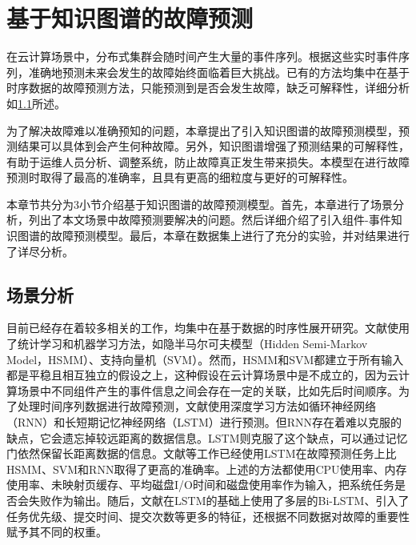 \chapter{基于知识图谱的故障预测}\label{chapter-predict-failure}
在云计算场景中，分布式集群会随时间产生大量的事件序列。根据这些实时事件序列，准确地预测未来会发生的故障始终面临着巨大挑战。已有的方法\cite{pitakrat2018hora,zhang2018prefix,baldoni2015line,xu2016health,cheng2018machine,du2017deeplog,das2018desh,islam2017predicting,cheng2018machine,du2017deeplog,das2018desh,gao2020task}均集中在基于时序数据的故障预测方法，只能预测到是否会发生故障，缺乏可解释性，详细分析如\ref{predict-analysis}所述。

为了解决故障难以准确预知的问题，本章提出了引入知识图谱的故障预测模型，预测结果可以具体到会产生何种故障。另外，知识图谱增强了预测结果的可解释性，有助于运维人员分析、调整系统，防止故障真正发生带来损失。本模型在进行故障预测时取得了最高的准确率，且具有更高的细粒度与更好的可解释性。

本章节共分为3小节介绍基于知识图谱的故障预测模型。首先，本章进行了场景分析，列出了本文场景中故障预测要解决的问题。然后详细介绍了引入组件-事件知识图谱的故障预测模型。最后，本章在数据集上进行了充分的实验，并对结果进行了详尽分析。
\section{场景分析}\label{predict-analysis}
目前已经存在着较多相关的工作，均集中在基于数据的时序性展开研究。文献\parencite{pitakrat2018hora,zhang2018prefix,baldoni2015line}使用了统计学习和机器学习方法，如隐半马尔可夫模型（Hidden Semi-Markov Model，HSMM）、支持向量机（SVM）。然而，HSMM和SVM都建立于所有输入都是平稳且相互独立的假设之上，这种假设在云计算场景中是不成立的，因为云计算场景中不同组件产生的事件信息之间会存在一定的关联，比如先后时间顺序。为了处理时间序列数据进行故障预测，文献\parencite{xu2016health,cheng2018machine,du2017deeplog,das2018desh,islam2017predicting}使用深度学习方法如循环神经网络（RNN）和长短期记忆神经网络（LSTM）进行预测。但RNN存在着难以克服的缺点，它会遗忘掉较远距离的数据信息。LSTM则克服了这个缺点，可以通过记忆门依然保留长距离数据的信息。文献\parencite{cheng2018machine,du2017deeplog,das2018desh}等工作已经使用LSTM在故障预测任务上比HSMM、SVM和RNN取得了更高的准确率。上述的方法都使用CPU使用率、内存使用率、未映射页缓存、平均磁盘I/O时间和磁盘使用率作为输入，把系统任务是否会失败作为输出。随后，文献\parencite{gao2020task}在LSTM的基础上使用了多层的Bi-LSTM、引入了任务优先级、提交时间、提交次数等更多的特征，还根据不同数据对故障的重要性赋予其不同的权重。

